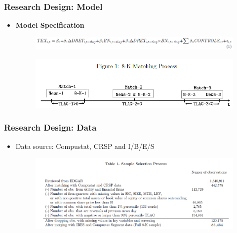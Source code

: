 \documentclass{beamer}
\begin{document}
\begin{frame}
	\frametitle{Research Design: Model}
	\begin{itemize}

\item \textbf{Model Specification}
%		
%	
		
		\begin{figure}[h]
			\centering
			\includegraphics[width=1\linewidth]{eq1}
			\label{eq1}
		\end{figure}
	
		\begin{figure}[h]
			\centering
			\includegraphics[width=0.8\linewidth]{fig1}
			\label{fig1}
		\end{figure}

\end{itemize}
\end{frame}
\begin{frame}
\frametitle{Research Design: Data}

\begin{itemize}
	\item Data source: Compustat, CRSP and I/B/E/S
	
	\begin{figure}[h]
		\centering
		\includegraphics[width=1\linewidth]{tab1}
		\label{tab1}
	\end{figure}

\end{itemize}
\end{frame}
\end{document}
